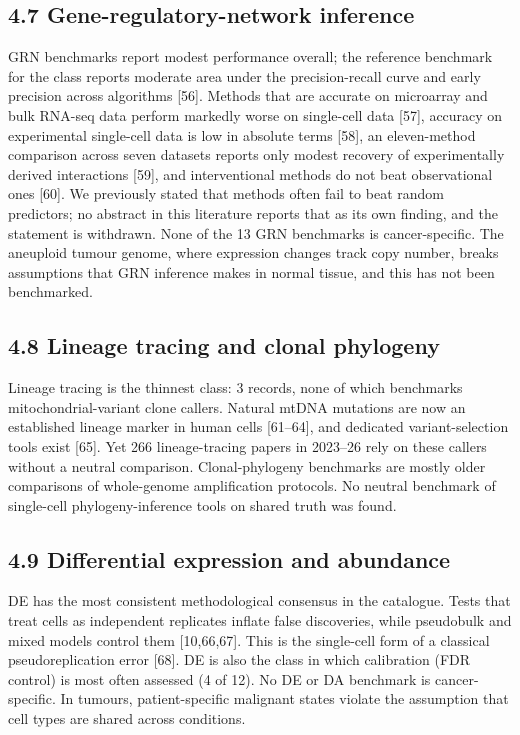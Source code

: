 \documentclass[11pt]{article}
\begin{document}
\subsection{4.7 Gene-regulatory-network inference}\label{gene-regulatory-network-inference}

GRN benchmarks report modest performance overall; the reference
benchmark for the class reports moderate area under the precision-recall
curve and early precision across algorithms {[}56{]}. Methods that are
accurate on microarray and bulk RNA-seq data perform markedly worse on
single-cell data {[}57{]}, accuracy on experimental single-cell data is
low in absolute terms {[}58{]}, an eleven-method comparison across seven
datasets reports only modest recovery of experimentally derived
interactions {[}59{]}, and interventional methods do not beat
observational ones {[}60{]}. We previously stated that methods often
fail to beat random predictors; no abstract in this literature reports
that as its own finding, and the statement is withdrawn. None of the 13
GRN benchmarks is cancer-specific. The aneuploid tumour genome, where
expression changes track copy number, breaks assumptions that GRN
inference makes in normal tissue, and this has not been benchmarked.

\subsection{4.8 Lineage tracing and clonal phylogeny}\label{lineage-tracing-and-clonal-phylogeny}

Lineage tracing is the thinnest class: 3 records, none of which
benchmarks mitochondrial-variant clone callers. Natural mtDNA mutations
are now an established lineage marker in human cells {[}61--64{]}, and
dedicated variant-selection tools exist {[}65{]}. Yet 266
lineage-tracing papers in 2023--26 rely on these callers without a
neutral comparison. Clonal-phylogeny benchmarks are mostly older
comparisons of whole-genome amplification protocols. No neutral
benchmark of single-cell phylogeny-inference tools on shared truth was
found.

\subsection{4.9 Differential expression and abundance}\label{differential-expression-and-abundance}

DE has the most consistent methodological consensus in the catalogue.
Tests that treat cells as independent replicates inflate false
discoveries, while pseudobulk and mixed models control them
{[}10,66,67{]}. This is the single-cell form of a classical
pseudoreplication error {[}68{]}. DE is also the class in which
calibration (FDR control) is most often assessed (4 of 12). No DE or DA
benchmark is cancer-specific. In tumours, patient-specific malignant
states violate the assumption that cell types are shared across
conditions.
\end{document}
